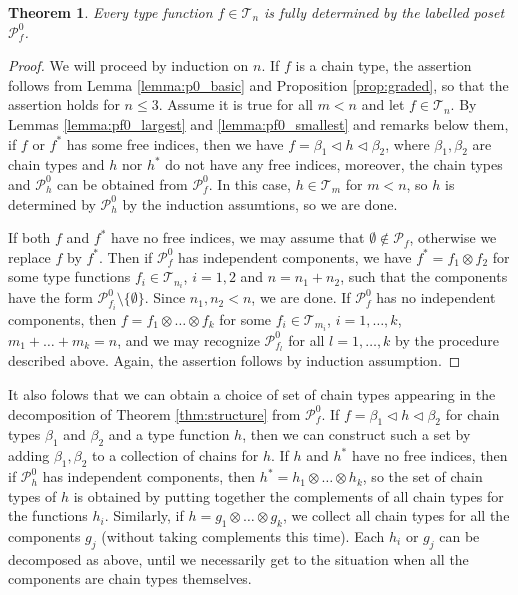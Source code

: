 \documentclass[12pt]{article}
\newtheorem{theorem}{Theorem}
\theoremstyle{definition}
\theoremstyle{remark}
\def\Te{\mathcal T}
\def\Pe{\mathcal P}
\def\vtl{\vartriangleleft}
\begin{document}
\begin{theorem}\label{thm:pf0} Every type function $f\in \Te_n$ is fully determined by the
labelled poset $\Pe_f^0$.  

\end{theorem}

\begin{proof}  We will proceed by induction on
$n$. If $f$ is a chain type, the assertion follows from Lemma
\ref{lemma:p0_basic} and Proposition \ref{prop:graded}, so that the assertion holds for
$n\le 3$. Assume it is true for all $m<n$ and let $f\in \Te_n$. By Lemmas
\ref{lemma:pf0_largest} and \ref{lemma:pf0_smallest} and remarks below them, if $f$ or
$f^*$ has
some free indices, then we have $f=\beta_1\vtl h \vtl \beta_2$, where $\beta_1,\beta_2$
are chain types and $h$ nor $h^*$ do not have any free indices, moreover,  the chain types and $\Pe_h^0$ 
 can be obtained from $\Pe_f^0$. In this case, $h\in \Te_m$ for $m<n$, so  $h$ is
 determined by $\Pe_h^0$ by the induction assumtions, so we are done.


If both $f$ and $f^*$ have no free indices, we may assume that $\emptyset \notin \Pe_f$, otherwise we 
replace $f$ by $f^*$. Then if $\Pe_f^0$ has independent components, we have
$f^*=f_1\otimes f_2$ for some type functions $f_i\in \Te_{n_i}$, $i=1,2$ and $n=n_1+n_2$,
such that the components have the form $\Pe_{f_i}^0\setminus \{\emptyset\}$. Since
$n_1,n_2<n$, we are done. If $\Pe_f^0$ has no independent components, then
$f=f_1\otimes\dots \otimes f_k$ for some $f_i\in \Te_{m_i}$, $i=1,\dots,k$, $m_1+\dots
+m_k=n$, and we may recognize  $\Pe_{f_l}^0$ for all $l=1,\dots,k$ by the procedure
described above. Again, the assertion follows by induction assumption.


\end{proof}


It also folows that we can obtain a choice of set of chain types  appearing in the decomposition
of Theorem \ref{thm:structure} from $\Pe_f^0$.	If $f=\beta_1\vtl h\vtl \beta_2$ for chain
types $\beta_1$ and $\beta_2$ and a type function $h$, then we can construct such a set
by adding $\beta_1,\beta_2$ to a collection of chains for $h$. If $h$ and $h^*$ 
have no free indices, then if $\Pe_h^0$ has independent components, then $h^*=h_1\otimes\dots \otimes h_k$, so the set of chain types of $h$ is obtained by putting
together the complements of all chain types for the functions $h_i$. Similarly, if
$h=g_1\otimes \dots\otimes g_k$, we collect all chain types for all the components $g_j$ (without taking 
complements this time). Each $h_i$ or $g_j$ can be decomposed as above, until we
necessarily get to the situation when all the components are chain types themselves.
\end{document}
